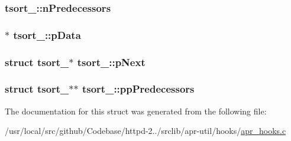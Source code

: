 \subsubsection[{\texorpdfstring{n\+Predecessors}{nPredecessors}}]{ tsort\+\_\+\+::n\+Predecessors}\hypertarget{structtsort___a0d9e22e0ca2b5397322d2a640ebb9bdf}{}\label{structtsort___a0d9e22e0ca2b5397322d2a640ebb9bdf}
\subsubsection[{\texorpdfstring{p\+Data}{pData}}]{$\ast$ tsort\+\_\+\+::p\+Data}\hypertarget{structtsort___a472f25d045aa66a6c4dd89a01fd275e7}{}\label{structtsort___a472f25d045aa66a6c4dd89a01fd275e7}
\subsubsection[{\texorpdfstring{p\+Next}{pNext}}]{\setlength{\rightskip}{0pt plus 5cm}struct {\bf tsort\+\_\+}$\ast$ tsort\+\_\+\+::p\+Next}\hypertarget{structtsort___a7c49d796ff9551e6cdb05f12f4d56fc6}{}\label{structtsort___a7c49d796ff9551e6cdb05f12f4d56fc6}
\subsubsection[{\texorpdfstring{pp\+Predecessors}{ppPredecessors}}]{\setlength{\rightskip}{0pt plus 5cm}struct {\bf tsort\+\_\+}$\ast$$\ast$ tsort\+\_\+\+::pp\+Predecessors}\hypertarget{structtsort___a03fe4cb59a9556bd7cfa0ba9701e0b7b}{}\label{structtsort___a03fe4cb59a9556bd7cfa0ba9701e0b7b}


The documentation for this struct was generated from the following file\+:\begin{DoxyCompactItemize}
\item 
/usr/local/src/github/\+Codebase/httpd-\/2../srclib/apr-\/util/hooks/\hyperlink{apr__hooks_8c}{apr\+\_\+hooks.\+c}\end{DoxyCompactItemize}
